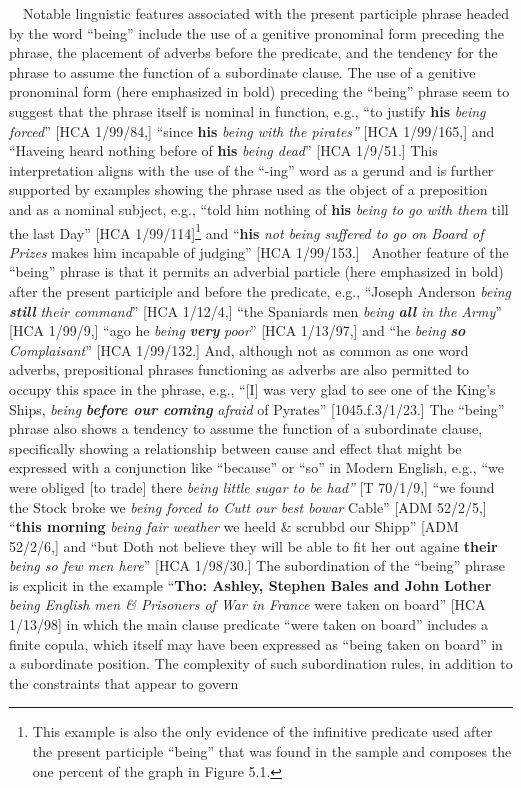 \begin{styleStandard}
\ \ Notable linguistic features associated with the present participle phrase headed by the word “being” include the use of a genitive pronominal form preceding the phrase, the placement of adverbs before the predicate, and the tendency for the phrase to assume the function of a subordinate clause. The use of a genitive pronominal form (here emphasized in bold) preceding the “being” phrase seem to suggest that the phrase itself is nominal in function, e.g., “to justify\textit{ }\textbf{his }\textit{being forced}” [HCA 1/99/84,] “since \textbf{his }\textit{being with the pirates”} [HCA 1/99/165,] and “Haveing heard nothing before of \textbf{his} \textit{being dead}” [HCA 1/9/51.] This interpretation aligns with the use of the “-ing” word as a gerund and is further supported by examples showing the phrase used as the object of a preposition and as a nominal subject, e.g., “told him nothing of\textbf{ his} \textit{being to go with them} till the last Day” [HCA 1/99/114]\footnote{ This example is also the only evidence of the infinitive predicate used after the present participle “being” that was found in the sample and composes the one percent of the graph in Figure 5.1. } and “\textbf{his }\textit{not being suffered to go on Board of Prizes} makes him incapable of judging” [HCA 1/99/153.] \ Another feature of the “being” phrase is that it permits an adverbial particle (here emphasized in bold) after the present participle and before the predicate, e.g., “Joseph Anderson \textit{being }\textbf{\textit{still}}\textit{ their command}” [HCA 1/12/4,] “the Spaniards men \textit{being }\textbf{\textit{all}}\textit{ in the Army}” [HCA 1/99/9,] “ago he \textit{being }\textbf{\textit{very}}\textit{ poor}” [HCA 1/13/97,] and “he \textit{being }\textbf{\textit{so}}\textit{ Complaisant}” [HCA 1/99/132.] And, although not as common as one word adverbs, prepositional phrases functioning as adverbs are also permitted to occupy this space in the phrase, e.g., “[I] was very glad to see one of the King’s Ships, \textit{being }\textbf{\textit{before our coming}}\textit{ afraid} of Pyrates” [1045.f.3/1/23.] The “being” phrase also shows a tendency to assume the function of a subordinate clause, specifically showing a relationship between cause and effect that might be expressed with a conjunction like “because” or “so” in Modern English, e.g., “we were obliged [to trade] there \textit{being little sugar to be had” }[T 70/1/9,] “we found the Stock broke we \textit{being forced to Cutt our best bowar }Cable” [ADM 52/2/5,] “\textbf{this morning} \textit{being fair weather} we heeld \& scrubbd our Shipp” [ADM 52/2/6,] and “but Doth not believe they will be able to fit her out againe \textbf{their} \textit{being so few men here}” [HCA 1/98/30.] The subordination of the “being” phrase is explicit in the example “\textbf{Tho: Ashley, Stephen Bales and John Lother} \textit{being English men \& Prisoners of War in France }were taken on board” [HCA 1/13/98] in which the main clause predicate “were taken on board” includes a finite copula, which itself may have been expressed as “being taken on board” in a subordinate position. The complexity of such subordination rules, in addition to the constraints that appear to govern 
\end{styleStandard}

